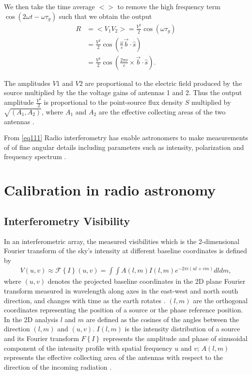 We then take the time average $<>$ to remove the high frequency term $\cos(2\omega t - \omega \tau_{g})$ such that we obtain the output 
\begin{align}
R&= <V_1V_2> = \frac{V^2}{2}  \cos (\omega\tau_{g})\\
  &= \frac{V^2}{2}  \cos \left( \frac{\omega}{c} \overrightarrow{b} \cdot \widehat{s} \right)\\
   &= \frac{V^2}{2}  \cos \left( \frac{2\pi \nu}{c} \times
   \overrightarrow{b} \cdot \widehat{s} \right). 
\end{align}

The amplitudes $V1$ and $V2$ are proportional to the electric field produced by the  source multiplied by the the voltage gains of antennas 1 and 2.  Thus the output amplitude $\frac{V^2}{2}$ is proportional to the point-source flux density $S$ multiplied by $\sqrt{(A_1, A_2)}$, where $A_1$ and $A_2$ are the effective collecting areas of the two antennas \citep{NRAO}.

From \ref{eq111} 
Radio interferometry has enable astronomers to make measurements of  of fine angular  details including parameters such as intensity, polarization and frequency spectrum \citep{thompson2001interferometry}.

\section{Calibration in radio astronomy}
\label{Calibr}
\subsection{Interferometry Visibility}
In an interferometric array, the measured visibilities  which is the 2-dimensional Fourier transform of the sky's intensity at different baseline coordinates is defined by
\begin{align}
V(u,v)\approx \mathcal{F}\left\{I\right\}(u,v)=\int \int A(l,m) I (l,m)e^{-2\pi i(ul+vm)} dl dm,
\label{Vis}
\end{align}
where $(u,v)$ denotes the projected baseline coordinates in the 2D plane Fourier transform measured in wavelength along axes in the east-west and north south direction,  and changes with time as the earth rotates  \citep{taylor1999synthesis}. $(l, m)$ are the orthogonal coordinates representing the position of a source or the phase reference position. In the 2D analysis $l$ and $m$ are defined as the cosines of the  angles between the direction $(l,m)$ and $(u, v)$. $I(l,m)$ is the intensity distribution of a source and its Fourier transform  ${F}\left\{I\right\}$ represents the amplitude and phase of sinusoidal component of the intensity profile with spatial frequency $u$ and $v$; $A(l, m)$ represents the effective collecting area of the antennas with respect to the direction of the incoming radiation \citep{thompson2001interferometry}.

